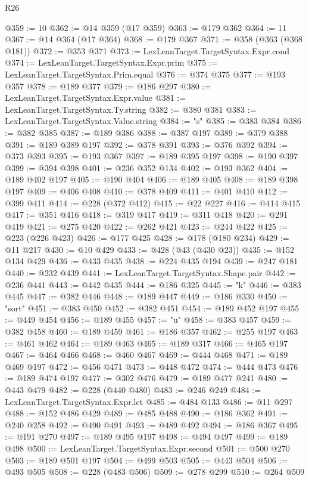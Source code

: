 \begin{lexlean}{R26}
\begin{coremodule}
@359 := 10
@362 := @14 @359 (@17 @359)
@363 := @179 @362
@364 := 11
@367 := @14 @364 (@17 @364)
@368 := @179 @367
@371 := @358 (@363 (@368 @181))
@372 := @353 @371
@373 := LexLeanTarget.TargetSyntax.Expr.cond
@374 := LexLeanTarget.TargetSyntax.Expr.prim
@375 := LexLeanTarget.TargetSyntax.Prim.equal
@376 := @374 @375
@377 := @193 @357
@378 := @189 @377
@379 := @186 @297
@380 := LexLeanTarget.TargetSyntax.Expr.value
@381 := LexLeanTarget.TargetSyntax.Ty.string
@382 := @380 @381
@383 := LexLeanTarget.TargetSyntax.Value.string
@384 := "s"
@385 := @383 @384
@386 := @382 @385
@387 := @189 @386
@388 := @387 @197
@389 := @379 @388
@391 := @189 @389 @197
@392 := @378 @391
@393 := @376 @392
@394 := @373 @393
@395 := @193 @367
@397 := @189 @395 @197
@398 := @190 @397
@399 := @394 @398
@401 := @236 @352 @134
@402 := @193 @362
@404 := @189 @402 @197
@405 := @190 @404
@406 := @189 @405
@408 := @189 @398 @197
@409 := @406 @408
@410 := @378 @409
@411 := @401 @410
@412 := @399 @411
@414 := @228 (@372 @412)
@415 := @22 @227
@416 := @414 @415
@417 := @351 @416
@418 := @319 @417
@419 := @311 @418
@420 := @291 @419
@421 := @275 @420
@422 := @262 @421
@423 := @244 @422
@425 := @223 (@226 @423)
@426 := @177 @425
@428 := @178 (@180 @234)
@429 := @11 @217
@430 := @10 @429
@433 := @428 (@43 (@430 @23))
@435 := @152 @134 @429
@436 := @433 @435
@438 := @224 @435 @194
@439 := @247 @181
@440 := @232 @439
@441 := LexLeanTarget.TargetSyntax.Shape.pair
@442 := @236 @441
@443 := @442 @435
@444 := @186 @325
@445 := "k"
@446 := @383 @445
@447 := @382 @446
@448 := @189 @447
@449 := @186 @330
@450 := "sort"
@451 := @383 @450
@452 := @382 @451
@454 := @189 @452 @197
@455 := @449 @454
@456 := @189 @455
@457 := "u"
@458 := @383 @457
@459 := @382 @458
@460 := @189 @459
@461 := @186 @357
@462 := @255 @197
@463 := @461 @462
@464 := @189 @463
@465 := @189 @317
@466 := @465 @197
@467 := @464 @466
@468 := @460 @467
@469 := @444 @468
@471 := @189 @469 @197
@472 := @456 @471
@473 := @448 @472
@474 := @444 @473
@476 := @189 @474 @197
@477 := @302 @476
@479 := @189 @477 @241
@480 := @443 @479
@482 := @228 (@440 @480)
@483 := @246 @249
@484 := LexLeanTarget.TargetSyntax.Expr.let
@485 := @484 @133
@486 := @11 @297
@488 := @152 @486 @429
@489 := @485 @488
@490 := @186 @362
@491 := @240 @258
@492 := @490 @491
@493 := @489 @492
@494 := @186 @367
@495 := @191 @270
@497 := @189 @495 @197
@498 := @494 @497
@499 := @189 @498
@500 := LexLeanTarget.TargetSyntax.Expr.second
@501 := @500 @270
@503 := @189 @501 @197
@504 := @499 @503
@505 := @443 @504
@506 := @493 @505
@508 := @228 (@483 @506)
@509 := @278 @299
@510 := @264 @509

\end{coremodule}
\end{lexlean}
